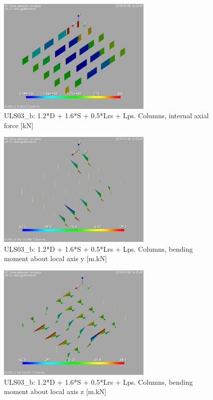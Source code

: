 \begin{figure}
\begin{center}
\includegraphics[width=75mm]{annex_res_columns/graphics/resSimplLC/ULS03_bcolumnsN}
\caption{ULS03\_b: 1.2*D + 1.6*S + 0.5*Lrs + Lps. Columns, internal axial force [kN]}
\end{center}
\end{figure}
\begin{figure}
\begin{center}
\includegraphics[width=75mm]{annex_res_columns/graphics/resSimplLC/ULS03_bcolumnsMy}
\caption{ULS03\_b: 1.2*D + 1.6*S + 0.5*Lrs + Lps. Columns, bending moment about local axis y [m.kN]}
\end{center}
\end{figure}
\begin{figure}
\begin{center}
\includegraphics[width=75mm]{annex_res_columns/graphics/resSimplLC/ULS03_bcolumnsMz}
\caption{ULS03\_b: 1.2*D + 1.6*S + 0.5*Lrs + Lps. Columns, bending moment about local axis z [m.kN]}
\end{center}
\end{figure}
